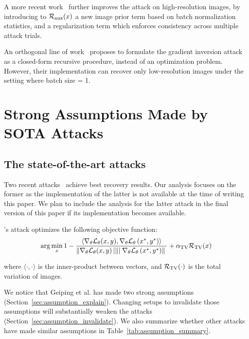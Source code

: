 A more recent work~\citep{yin2021see} further improves the attack on high-resolution images, by introducing to $\mathcal{R}_{\rm aux}(x)$ a new image prior term based on batch normalization~\citep{ioffe2015batch} statistics,  and a regularization term which enforces consistency across multiple attack trials. 

An orthogonal line of work~\citep{zhu2020r} proposes to formulate the gradient inversion attack as a closed-form recursive procedure, instead of an optimization problem. However, their implementation can recover only low-resolution images under the setting where batch size = 1. 

\section{Strong Assumptions Made by SOTA Attacks}
\label{sec:assumption}

\subsection{The state-of-the-art attacks} 

Two recent attacks~\citep{geiping2020inverting,yin2021see} achieve best recovery results.  Our analysis focuses on the former as the implementation of the latter is not available at the time of writing this paper.
We plan to include the analysis for the latter attack in the final version of this paper if its implementation becomes available.

\citep{geiping2020inverting}'s attack optimizes the following objective function:
\begingroup
\begin{equation}
    \arg \min _{x}  1-\frac{\left\langle\nabla_{\theta} \mathcal{L}_{\theta}(x, y), \nabla_{\theta} \mathcal{L}_{\theta}\left(x^{*}, y^{*}\right)\right\rangle}{\left\|\nabla _ { \theta } \mathcal { L } _ { \theta } ( x , y ) \left|\left\|\mid \nabla_{\theta} \mathcal{L}_{\theta}\left(x^{*}, y^{*}\right)\right\|\right.\right.}+ \alpha_{\rm TV} \mathcal{R}_{\rm TV}(x)
\end{equation}
\endgroup

where $\langle \cdot, \cdot \rangle$ is the inner-product between vectors, and $\mathcal{R}_{\rm TV}(\cdot)$ is the total variation of images.

We notice that Geiping et al. has made two strong assumptions (Section~\ref{sec:assumption_explain}). Changing setups to invalidate those assumptions will substantially weaken the attacks (Section~\ref{sec:assumption_invalidate}). We also summarize whether other attacks have made similar assumptions in Table~\ref{tab:assumption_summary}.



